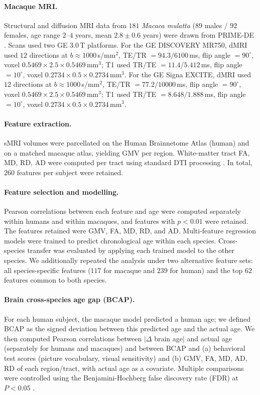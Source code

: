 \documentclass[11pt]{article}
\begin{document}
\paragraph{Macaque MRI.} Structural and diffusion MRI data from $181$ \textit{Macaca mulatta} ($89$ males / $92$ females, age range $2$--$4$ years, mean $2.8 \pm 0.6$ years) were drawn from PRIME-DE \cite{milham2018prime}. Scans used two GE 3.0\,T platforms. For the GE DISCOVERY MR750, dMRI used $12$ directions at $b \approx 1000$\,s/mm$^2$, TE/TR $= 94.3/6100$\,ms, flip angle $= 90^\circ$, voxel $0.5469 \times 2.5 \times 0.5469$\,mm$^3$; T1 used TR/TE $= 11.4/5.412$\,ms, flip angle $= 10^\circ$, voxel $0.2734 \times 0.5 \times 0.2734$\,mm$^3$. For the GE Signa EXCITE, dMRI used $12$ directions at $b \approx 1000$\,s/mm$^2$, TE/TR $= 77.2/10000$\,ms, flip angle $= 90^\circ$, voxel $0.5469 \times 2.5 \times 0.5469$\,mm$^3$; T1 used TR/TE $= 8.648/1.888$\,ms, flip angle $= 10^\circ$, voxel $0.2734 \times 0.5 \times 0.2734$\,mm$^3$.

\paragraph{Feature extraction.} sMRI volumes were parcellated on the Human Brainnetome Atlas (human) \cite{fan2016brainnetome} and on a matched macaque atlas, yielding GMV per region. White-matter tract FA, MD, RD, AD were computed per tract using standard DTI processing \cite{basser1994dti,jenkinson2012fsl}. In total, $260$ features per subject were retained.

\paragraph{Feature selection and modelling.} Pearson correlations between each feature and age were computed separately within humans and within macaques, and features with $p < 0.01$ were retained. The features retained were GMV, FA, MD, RD, and AD. Multi-feature regression models were trained to predict chronological age within each species. Cross-species transfer was evaluated by applying each trained model to the other species. We additionally repeated the analysis under two alternative feature sets: all species-specific features ($117$ for macaque and $239$ for human) and the top $62$ features common to both species.

\paragraph{Brain cross-species age gap (BCAP).} For each human subject, the macaque model predicted a human age; we defined BCAP as the signed deviation between this predicted age and the actual age. We then computed Pearson correlations between $|\Delta$ brain age$|$ and actual age (separately for humans and macaques) and between BCAP and (a) behavioral test scores (picture vocabulary, visual sensitivity) and (b) GMV, FA, MD, AD, RD of each region/tract, with actual age as a covariate. Multiple comparisons were controlled using the Benjamini-Hochberg false discovery rate (FDR) at $P < 0.05$ \cite{benjamini1995fdr}.
\end{document}
